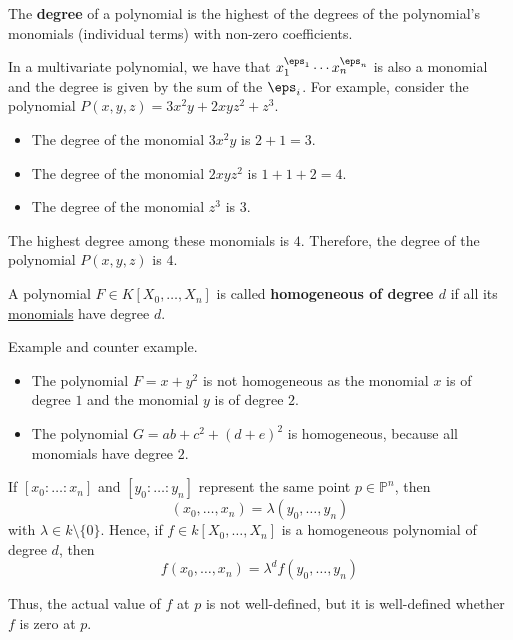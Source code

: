 \documentclass[12pt, a4paper]{article}
\begin{document}
\begin{definition}
    The \textbf{degree} of a polynomial is the highest of the degrees of the polynomial's monomials (individual terms) with non-zero coefficients. 
\end{definition}

\begin{mdremark}
    In a multivariate polynomial, we have that \(x_1^{\eps_1}\cdots x_n^{\eps_n}\) is also a monomial and the degree is given by the sum of the \(\eps_i\). For example, consider the polynomial \(P(x, y, z) = 3x^2y + 2xyz^2 + z^3\).
    \begin{itemize}
        \item The degree of the monomial \(3x^2y\) is \(2 + 1 = 3\).
        \item The degree of the monomial \(2xyz^2\) is \(1 + 1 + 2 = 4\).
        \item The degree of the monomial \(z^3\) is \(3\).
    \end{itemize}
    The highest degree among these monomials is \(4\). Therefore, the degree of the polynomial \(P(x, y, z)\) is \(4\).
\end{mdremark}

\begin{definition}
    A polynomial \(F \in K[X_0,\ldots,X_n]\) is called \textbf{homogeneous of degree \(d\)} if all its \ul{monomials} have degree \(d\). 
\end{definition}

\begin{mdexample}
    Example and counter example.
    \begin{itemize}
        \item The polynomial \(F=x+y^2\) is not homogeneous as the monomial \(x\) is of degree \(1\) and the monomial \(y\) is of degree \(2\).
        \item The polynomial \(G = ab+c^2+(d+e)^2\) is homogeneous, because all monomials have degree \(2\).
    \end{itemize}
\end{mdexample}

\begin{mdthm}
    If \([x_0 : \ldots : x_n]\) and \([y_0 : \ldots : y_n]\) represent the same point \(p \in \mathbb{P}^n\), then
\[
(x_0, \ldots, x_n) = \lambda(y_0, \ldots, y_n)
\]
with \(\lambda \in k \setminus \{0\}\). Hence, if \(f \in k[X_0, \ldots, X_n]\) is a homogeneous polynomial of degree \(d\), then
\[
f(x_0, \ldots, x_n) = \lambda^d f(y_0, \ldots, y_n)
\]

Thus, the actual value of \(f\) at \(p\) is not well-defined, but it is well-defined whether \(f\) is zero at \(p\).

\end{mdthm}
\end{document}
